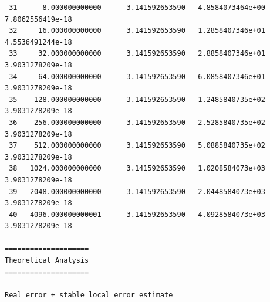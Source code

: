 \documentclass[12pt,a4paper]{article}
\begin{document}
\begin{lstlisting}
 31      8.000000000000      3.141592653590   4.8584073464e+00   7.8062556419e-18
 32     16.000000000000      3.141592653590   1.2858407346e+01   4.5536491244e-18
 33     32.000000000000      3.141592653590   2.8858407346e+01   3.9031278209e-18
 34     64.000000000000      3.141592653590   6.0858407346e+01   3.9031278209e-18
 35    128.000000000000      3.141592653590   1.2485840735e+02   3.9031278209e-18
 36    256.000000000000      3.141592653590   2.5285840735e+02   3.9031278209e-18
 37    512.000000000000      3.141592653590   5.0885840735e+02   3.9031278209e-18
 38   1024.000000000000      3.141592653590   1.0208584073e+03   3.9031278209e-18
 39   2048.000000000000      3.141592653590   2.0448584073e+03   3.9031278209e-18
 40   4096.000000000001      3.141592653590   4.0928584073e+03   3.9031278209e-18

====================
Theoretical Analysis
====================

Real error + stable local error estimate


\end{lstlisting}
\end{document}
